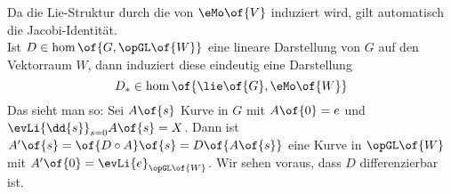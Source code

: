 Da die Lie-Struktur durch die von $\eMo\of{V}$ induziert wird, gilt automatisch die Jacobi-Identität. \\
Ist $D \in \hom\of{G,\opGL\of{W}}$ eine lineare Darstellung von $G$ auf den Vektorraum $W$, dann induziert diese eindeutig eine Darstellung
\begin{equation}
	D_{*} \in \hom\of{\lie\of{G},\eMo\of{W}}
\end{equation}
Das sieht man so: Sei $A\of{s}$ Kurve in $G$ mit $A\of{0} = e$ und $\evLi{\dd{s}}_{s=0} A\of{s} = X$. Dann ist $A'\of{s} = \of{D\circ A}\of{s} = D\of{A\of{s}}$ eine Kurve in $\opGL\of{W}$ mit $A'\of{0} = \evLi{e}_{\opGL\of{W}}$. Wir sehen voraus, dass $D$ differenzierbar ist.